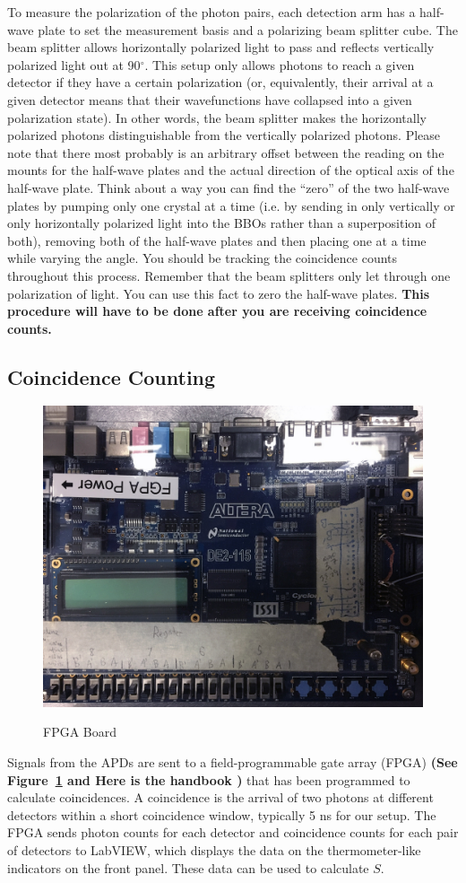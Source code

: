\documentclass{../lab}
\begin{document}
To measure the polarization of the photon pairs, each detection arm has a half-wave plate to set the measurement basis and a polarizing beam splitter cube. The beam splitter allows horizontally polarized light to pass and reflects vertically polarized light out at 90$^\circ$. This setup only allows photons to reach a given detector if they have a certain polarization (or, equivalently, their arrival at a given detector means that their wavefunctions have collapsed into a given polarization state). In other words, the beam splitter makes the horizontally polarized photons distinguishable from the vertically polarized photons. Please note that there most probably is an arbitrary offset between the reading on the mounts for the half-wave plates and the actual direction of the optical axis of the half-wave plate. Think about a way you can find the ``zero'' of the two half-wave plates by pumping only one crystal at a time (i.e. by sending in only vertically or only horizontally polarized light into the BBOs rather than a superposition of both), removing both of the half-wave plates and then placing one at a time while varying the angle. You should be tracking the coincidence counts throughout this process. Remember that the beam splitters only let through one polarization of light. You can use this fact to zero the half-wave plates. \textbf{This procedure will have to be done after you are receiving coincidence counts. }

\subsection{Coincidence Counting}
\begin{figure}[H]
    \centering
    \href{http://experimentationlab.berkeley.edu/sites/default/files/images/QIE_FPGA.jpg}{\includegraphics[width=0.6\linewidth,keepaspectratio]{images/QIE_FPGA.jpg}}
    \caption{FPGA Board}
    \label{fig:FPGA.jpg}
\end{figure}
Signals from the APDs are sent to a field-programmable gate array (FPGA) \textbf{(See Figure~\ref{fig:FPGA.jpg} and Here is the handbook \cite{AlteraDE2Headbook})} that has been programmed to calculate coincidences. A coincidence is the arrival of two photons at different detectors within a short coincidence window, typically 5 ns for our setup. The FPGA sends photon counts for each detector and coincidence counts for each pair of detectors to LabVIEW, which displays the data on the thermometer-like indicators on the front panel. These data can be used to calculate $S$.
\end{document}
